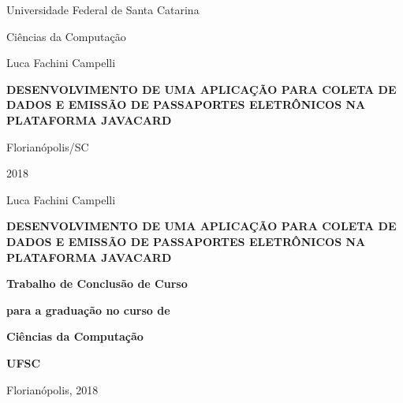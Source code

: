 \documentclass[11pt]{article}
\begin{document}
	\begin{center}

		{\LARGE Universidade Federal de Santa Catarina \par}
		\vspace {2cm}
		
		Ciências da Computação
		\vspace{2cm}

		Luca Fachini Campelli
		\vspace {4cm}

		\textbf{DESENVOLVIMENTO DE UMA APLICAÇÃO PARA COLETA DE DADOS 
				E EMISSÃO DE PASSAPORTES ELETRÔNICOS NA PLATAFORMA JAVACARD}
		\vspace {10cm}
		
		Florianópolis/SC 

		2018
	\end{center}

	\newpage
	\begin{center}
		Luca Fachini Campelli
		\vspace{2cm}
		
		\textbf{\large DESENVOLVIMENTO DE UMA APLICAÇÃO PARA COLETA DE DADOS 
				E EMISSÃO DE PASSAPORTES ELETRÔNICOS NA PLATAFORMA JAVACARD}
		\vspace{2cm}

		\hfill \textbf{Trabalho de Conclusão de Curso }
		
		\hfill \textbf{para a graduação no curso de }
		
		\hfill \textbf{Ciências \hspace{18pt} da \hspace{18pt} Computação }
		
		\hfill \textbf{UFSC  \hspace{60pt}}

		\vspace{1cm}

		\hfill Florianópolis, 2018

	\end{center}

	\newpage
	
\end{document}

